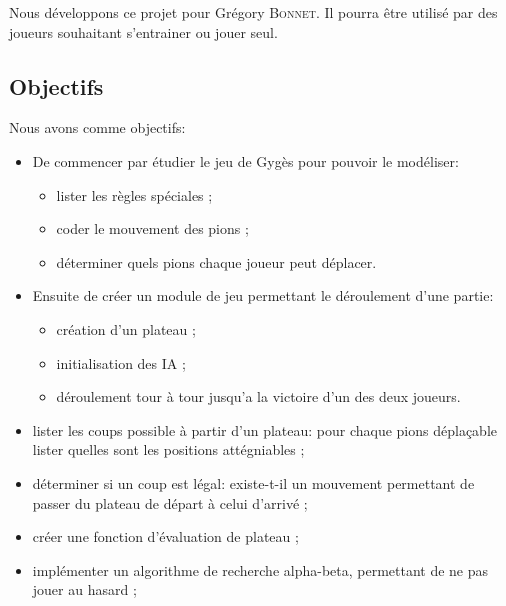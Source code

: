 \documentclass[a4paper]{article}
\begin{document}
	Nous développons ce projet pour Grégory \textsc{Bonnet}. Il pourra être utilisé
	par des joueurs souhaitant s'entrainer ou jouer seul.

	\subsection{Objectifs}
		Nous avons comme objectifs:

		\vspace{1em}
		\begin{itemize}
			\item De commencer par étudier le jeu de Gygès pour pouvoir le modéliser:
				\begin{itemize}
					\item lister les règles spéciales ;
					\item coder le mouvement des pions ;
					\item déterminer quels pions chaque joueur peut déplacer.
				\end{itemize}

			\vspace{1em}
			\item Ensuite de créer un module de jeu permettant le déroulement d'une partie:
				\begin{itemize}
					\item création d'un plateau ;
					\item initialisation des IA ;
					\item déroulement tour à tour jusqu'a la victoire d'un des deux joueurs.
				\end{itemize}

			\vspace{1em}
			\item lister les coups possible à partir d'un plateau:
				pour chaque pions déplaçable lister quelles sont les positions attégniables ;

			\vspace{1em}
			\item déterminer si un coup est légal: existe-t-il un mouvement permettant
				de passer du plateau de départ à celui d'arrivé ;

			\vspace{1em}
			\item créer une fonction d'évaluation de plateau ;

			\vspace{1em}
			\item implémenter un algorithme de recherche alpha-beta, permettant de ne pas
				jouer au hasard ;


\end{itemize}
\end{document}
